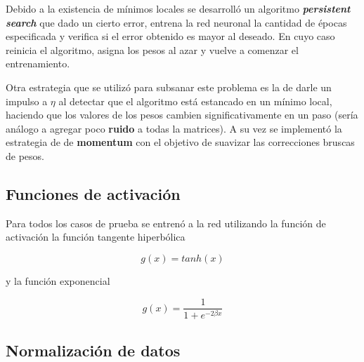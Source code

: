 \documentclass[%
    final,
    reprint,
    notitlepage,
    narroweqnarray,
    inline,
    twoside,
    invited
    ]{ieee}
\begin{document}
\par Debido a la existencia de mínimos locales se desarrolló un algoritmo  \textbf{\textit{persistent search}} que dado un cierto error, entrena
 la red neuronal la cantidad de épocas especificada y verifica si el error obtenido es mayor al deseado. En cuyo caso reinicia el algoritmo, asigna 
los pesos al azar y vuelve a comenzar el entrenamiento.\\

\par Otra estrategia que se utilizó para subsanar este problema es la de darle un impulso a $\eta$ al detectar que el algoritmo está estancado en un mínimo local, haciendo que los valores de los pesos cambien significativamente en un paso (sería análogo a agregar poco \textbf{ruido} a todas la matrices). A su vez se implementó la estrategia de de \textbf{momentum} con el objetivo de suavizar las correcciones bruscas de pesos.

\subsection{Funciones de activación}

\par Para todos los casos de prueba se entrenó a la red utilizando la función de activación la función tangente hiperbólica

\begin{equation}
g(x) = tanh(x)
\end{equation}


y la función exponencial

\begin{equation}
g(x) = \frac{1}{1+e^{-2 \beta x}}
\end{equation}

\subsection{Normalización de datos}
\end{document}
